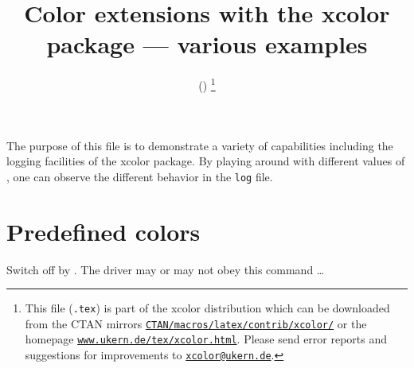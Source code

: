 \documentclass[a4paper]{article}
\begin{document}
\title{Color extensions with the \textsf{xcolor} package --- various examples}
\author{\href{mailto:xcolor@ukern.de}{}}
\date{\XCfileversion{} (\XCfiledate)
\thanks{This file (\texttt{\jobname.tex}) is part of the \textsf{xcolor} distribution which can be downloaded from the CTAN mirrors \texttt{\href{http://www.ctan.org/tex-archive/macros/latex/contrib/xcolor/}{CTAN/macros/latex/contrib/xcolor/}} or the homepage \texttt{\href{http://www.ukern.de/tex/xcolor.html}{www.ukern.de/tex/xcolor.html}}. Please send error reports and suggestions for improvements to \texttt{\href{mailto:xcolor@ukern.de}{xcolor@ukern.de}}.}}
\maketitle

The purpose of this file is to demonstrate a variety of capabilities including the logging facilities of the \textsf{xcolor} package.
By playing around with different values of \texttt{\string\tracingcolors}, one can observe the different behavior in the \texttt{log} file.

\section{Predefined colors}

\begingroup
\small\sffamily
{}
\begin{testcolors}
\noalign{\medskip}\hline\noalign{\medskip}
\noalign{\medskip}\hline\noalign{\medskip}
\noalign{\medskip}\hline\noalign{\medskip}
\end{testcolors}
\endgroup

\vfill

\clearpage
\nopagecolor
Switch off \texttt{\string\pagecolor} by \texttt{\string\nopagecolor}.
The driver may or may not obey this command \dots
\end{document}
